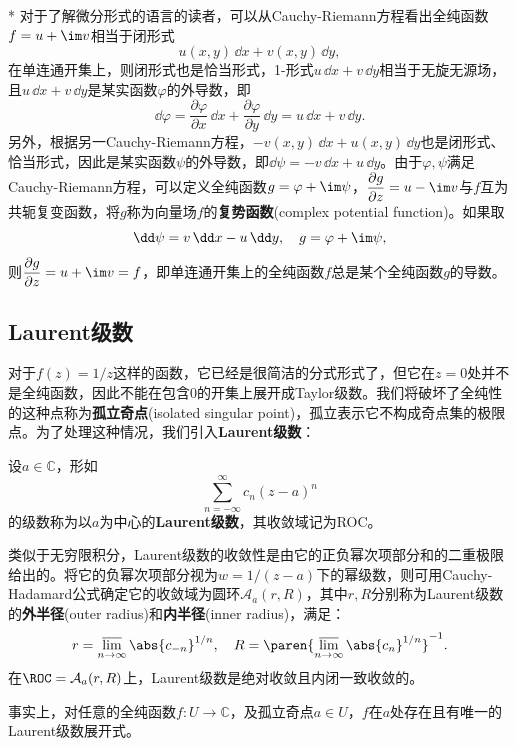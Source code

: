 \begin{remark}*
    对于了解微分形式的语言的读者，可以从Cauchy-Riemann方程看出全纯函数$f=u+\im v$相当于闭形式
    \begin{equation}
        u(x,y)\,\dd x+v(x,y)\,\dd y,
    \end{equation}
    在单连通开集上，则闭形式也是恰当形式，1-形式$u\,\dd x+v\,\dd y$相当于无旋无源场，且$u\,\dd x+v\,\dd y$是某实函数$\varphi$的外导数，即
    \begin{equation}
        \dd\varphi=\frac{\partial\varphi}{\partial x}\,\dd x+\frac{\partial\varphi}{\partial y}\,\dd y=u\,\dd x+v\,\dd y.
    \end{equation}
    另外，根据另一Cauchy-Riemann方程，$-v(x,y)\,\dd x+u(x,y)\,\dd y$也是闭形式、恰当形式，因此是某实函数$\psi$的外导数，即$\dd\psi=-v\,\dd x+u\,\dd y$。由于$\varphi,\psi$满足Cauchy-Riemann方程，可以定义全纯函数$g=\varphi+\im\psi$，$\displaystyle\frac{\partial g}{\partial z}=u-\im v$与$f$互为共轭复变函数，将$g$称为向量场$f$的\textbf{复势函数}(complex potential function)。如果取
    \begin{equation}
        \dd\psi=v\,\dd x-u\,\dd y,\quad g=\varphi+\im\psi,
    \end{equation}
    则$\displaystyle\frac{\partial g}{\partial z}=u+\im v=f$，即单连通开集上的全纯函数$f$总是某个全纯函数$g$的导数。
\end{remark}

\subsection{Laurent级数}\label{sub:laurant_series}
对于$f(z)=1/z$这样的函数，它已经是很简洁的分式形式了，但它在$z=0$处并不是全纯函数，因此不能在包含$0$的开集上展开成Taylor级数。我们将破坏了全纯性的这种点称为\textbf{孤立奇点}(isolated singular point)，孤立表示它不构成奇点集的极限点。为了处理这种情况，我们引入\textbf{Laurent级数}：

\begin{definition}[Laurent级数]
    设$a\in\mathbb{C}$，形如
    \begin{equation}
        \sum_{n=-\infty}^{\infty}c_n(z-a)^n
    \end{equation}
    的级数称为以$a$为中心的\textbf{Laurent级数}，其收敛域记为ROC。

    类似于无穷限积分，Laurent级数的收敛性是由它的正负幂次项部分和的二重极限给出的。将它的负幂次项部分视为$w=1/(z-a)$下的幂级数，则可用Cauchy-Hadamard公式确定它的收敛域为圆环$\mathcal{A}_a(r,R)$，其中$r,R$分别称为Laurent级数的\textbf{外半径}(outer radius)和\textbf{内半径}(inner radius)，满足：
    \begin{equation}
        r=\varlimsup_{n\to\infty}\abs{c_{-n}}^{1/n},\quad R=\paren{\varlimsup_{n\to\infty}\abs{c_n}^{1/n}}^{-1}.
    \end{equation}
    在$\ROC=\mathcal{A}_a(r,R)$上，Laurent级数是绝对收敛且内闭一致收敛的。
\end{definition}
事实上，对任意的全纯函数$f:U\to\mathbb{C}$，及孤立奇点$a\in U$，$f$在$a$处存在且有唯一的Laurent级数展开式。

